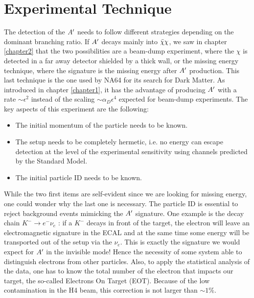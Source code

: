\section{Experimental Technique}
\label{ch2:sec:experimental-technique}

The detection of the $A'$ needs to follow different strategies depending on the dominant branching ratio. If $A'$ decays mainly into $\bar{\chi} \chi$, we saw in chapter \ref{chapter2} that the two possibilities are a beam-dump experiment, where the $\chi$ is detected in a far away detector shielded by a thick wall, or the missing energy technique, where the signature is the missing energy after $A'$ production. This last technique is the one used by NA64 for its search for Dark Matter. As introduced in chapter \ref{chapter1}, it has the advantage of producing $A'$ with a rate $\sim \epsilon^2$ instead of the scaling $\sim \alpha_D \epsilon^4$ expected for beam-dump experiments. The key aspects of this experiment are the following:

\begin{itemize}
\item The initial momentum of the particle needs to be known.
\item The setup needs to be completely hermetic, i.e. no energy can escape detection at the level of the experimental sensitivity using channels predicted by the Standard Model.
\item The initial particle ID needs to be known.
\end{itemize}

While the two first items are self-evident since we are looking for missing energy, one could wonder why the last one is necessary. The particle ID is essential to reject background events mimicking the $A'$ signature. One example is the decay chain $K^- \to e^- \nu_e$ \cite{review-particle-physics}: if a $K^-$ decays in front of the target, the electron will leave an electromagnetic signature in the ECAL and at the same time some energy will be transported out of the setup via the $\nu_e$. This is exactly the signature we would expect for $A'$ in the invisible mode! Hence the necessity of some system able to distinguish electrons from other particles. Also,  to apply the statistical analysis of the data, one has to know the total number of the electron that impacts our target, the so-called Electrons On Target (EOT). Because of the low contamination in the H4 beam, this correction is not larger than $\sim1\%$.

